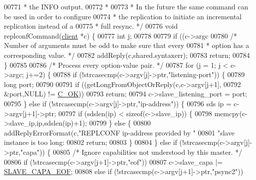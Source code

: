 \begin{DoxyCode}
{{{{{{{{{{{{{{{{{{{{{{{{{{{{{{00771 \textcolor{comment}{ * the INFO output.}
00772 \textcolor{comment}{ *}
00773 \textcolor{comment}{ * In the future the same command can be used in order to configure}
00774 \textcolor{comment}{ * the replication to initiate an incremental replication instead of a}
00775 \textcolor{comment}{ * full resync. */}
00776 \textcolor{keywordtype}{void} replconfCommand(\hyperlink{structclient}{client} *c) \{
00777     \textcolor{keywordtype}{int} j;
00778 
00779     \textcolor{keywordflow}{if} ((c->argc %
00780         \textcolor{comment}{/* Number of arguments must be odd to make sure that every}
00781 \textcolor{comment}{         * option has a corresponding value. */}
00782         addReply(c,shared.syntaxerr);
00783         \textcolor{keywordflow}{return};
00784     \}
00785 
00786     \textcolor{comment}{/* Process every option-value pair. */}
00787     \textcolor{keywordflow}{for} (j = 1; j < c->argc; j+=2) \{
00788         \textcolor{keywordflow}{if} (!strcasecmp(c->argv[j]->ptr,\textcolor{stringliteral}{"listening-port"})) \{
00789             \textcolor{keywordtype}{long} port;
00790 
00791             \textcolor{keywordflow}{if} ((getLongFromObjectOrReply(c,c->argv[j+1],
00792                     &port,NULL) != \hyperlink{server_8h_a303769ef1065076e68731584e758d3e1}{C\_OK}))
00793                 \textcolor{keywordflow}{return};
00794             c->slave\_listening\_port = port;
00795         \} \textcolor{keywordflow}{else} \textcolor{keywordflow}{if} (!strcasecmp(c->argv[j]->ptr,\textcolor{stringliteral}{"ip-address"})) \{
00796             sds ip = c->argv[j+1]->ptr;
00797             \textcolor{keywordflow}{if} (sdslen(ip) < \textcolor{keyword}{sizeof}(c->slave\_ip)) \{
00798                 memcpy(c->slave\_ip,ip,sdslen(ip)+1);
00799             \} \textcolor{keywordflow}{else} \{
00800                 addReplyErrorFormat(c,\textcolor{stringliteral}{"REPLCONF ip-address provided by "}
00801                     \textcolor{stringliteral}{"slave instance is too long: %
00802                 \textcolor{keywordflow}{return};
00803             \}
00804         \} \textcolor{keywordflow}{else} \textcolor{keywordflow}{if} (!strcasecmp(c->argv[j]->ptr,\textcolor{stringliteral}{"capa"})) \{
00805             \textcolor{comment}{/* Ignore capabilities not understood by this master. */}
00806             \textcolor{keywordflow}{if} (!strcasecmp(c->argv[j+1]->ptr,\textcolor{stringliteral}{"eof"}))
00807                 c->slave\_capa |= \hyperlink{server_8h_a679170caf08eeb16170fc653c9c1dfb2}{SLAVE\_CAPA\_EOF};
00808             \textcolor{keywordflow}{else} \textcolor{keywordflow}{if} (!strcasecmp(c->argv[j+1]->ptr,\textcolor{stringliteral}{"psync2"}))
}}}}}}}}}}}}}}}}}}}}}}}}}}}}}}}
\end{DoxyCode}
